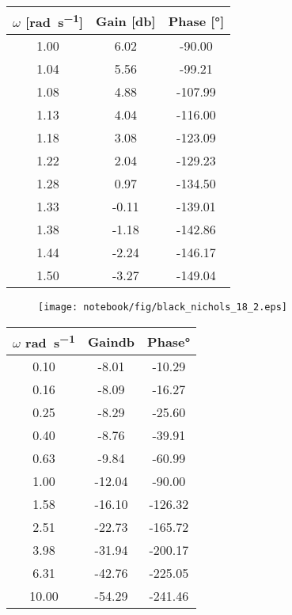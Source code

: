 \begin{center}
\begin{tabular}{ccc}
\hline
$\omega$ [\si{\radian\per\second}] & Gain [\si{\decibel}] & Phase [\si{\degree}]\\
\hline
1.00 & 6.02 & -90.00\\
1.04 & 5.56 & -99.21\\
1.08 & 4.88 & -107.99\\
1.13 & 4.04 & -116.00\\
1.18 & 3.08 & -123.09\\
1.22 & 2.04 & -129.23\\
1.28 & 0.97 & -134.50\\
1.33 & -0.11 & -139.01\\
1.38 & -1.18 & -142.86\\
1.44 & -2.24 & -146.17\\
1.50 & -3.27 & -149.04\\
\hline
\end{tabular}
\end{center}

\begin{figure}[!h]
    \centering
    \texttt{[image: notebook/fig/black\_nichols\_18\_2.eps]}
\end{figure}

\begin{center}
\begin{tabular}{ccc}
\hline
$\omega$ \si{\radian\per\second} & Gain\si{\decibel} & Phase\si{\degree}\\
\hline
0.10 & -8.01 & -10.29\\
0.16 & -8.09 & -16.27\\
0.25 & -8.29 & -25.60\\
0.40 & -8.76 & -39.91\\
0.63 & -9.84 & -60.99\\
1.00 & -12.04 & -90.00\\
1.58 & -16.10 & -126.32\\
2.51 & -22.73 & -165.72\\
3.98 & -31.94 & -200.17\\
6.31 & -42.76 & -225.05\\
10.00 & -54.29 & -241.46\\
\hline
\end{tabular}
\end{center}


